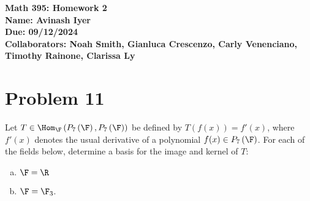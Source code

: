 \documentclass[12pt]{mypackage}
\begin{document}
\RaggedRight
\begin{center}
  \bfseries
  Math 395: Homework 2\\
  Name: Avinash Iyer\\
  Due: 09/12/2024\\
  Collaborators: Noah Smith, Gianluca Crescenzo, Carly Venenciano, Timothy Rainone, Clarissa Ly
\end{center}
\section{Problem 11}%
\begin{problem}
  Let $T\in \Hom_{\F}\left(P_7\left(\F\right),P_{7}\left(\F\right)\right)$ be defined by $T\left(f(x)\right) = f'(x)$, where $f'(x)$ denotes the usual derivative of a polynomial $f(x)\in P_{7}\left(\F\right)$. For each of the fields below, determine a basis for the image and kernel of $T$:
  \begin{enumerate}[(a)]
    \item $\F = \R$
    \item $\F = \F_{3}$.
  \end{enumerate}
\end{problem}
\end{document}
